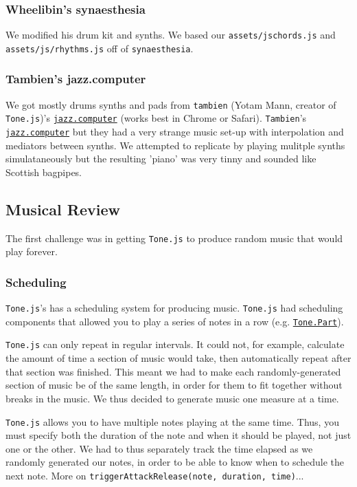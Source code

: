 \documentclass[12pt,a4paper]{article}
\newcommand{\code}{\texttt}
\newcommand{\lightcode}[1]{\colorbox{light-gray}{\texttt{#1}}}
\begin{document}
\subsubsection{Wheelibin's synaesthesia}
We modified his drum kit and synths. We based our \code{assets/jschords.js} and \code{assets/js/rhythms.js} off of \lightcode{synaesthesia}.

\subsubsection{Tambien's jazz.computer}
We got mostly drums synths and pads from \code{tambien} (Yotam Mann, creator of \lightcode{Tone.js})'s \href{http://jazz.computer/}{\lightcode{jazz.computer}} (works best in Chrome or Safari). \code{Tambien}'s \href{http://jazz.computer/}{\lightcode{jazz.computer}} but they had a very strange music set-up with interpolation and mediators between synths. We attempted to replicate by playing mulitple synths simulataneously but the resulting 'piano' was very tinny and sounded like Scottish bagpipes.


\subsection{Musical Review}

The first challenge was in getting \lightcode{Tone.js} to produce random music that would play forever.

\subsubsection{Scheduling}
\lightcode{Tone.js}'s has a scheduling system for producing music. \lightcode{Tone.js} had scheduling components that allowed you to play a series of notes in a row (e.g. \href{https://tonejs.github.io/docs/r12/Part}{\lightcode{Tone.Part}}).

\lightcode{Tone.js} can only repeat in regular intervals. It could not, for example, calculate the amount of time a section of music would take, then automatically repeat after that section was finished. This meant we had to make each randomly-generated section of music be of the same length, in order for them to fit together without breaks in the music. We thus decided to generate music one measure at a time.

\lightcode{Tone.js} allows you to have multiple notes playing at the same time. Thus, you must specify both the duration of the note and when it should be played, not just one or the other. We had to thus separately track the time elapsed as we randomly generated our notes, in order to be able to know when to schedule the next note. More on \code{triggerAttackRelease(note, duration, time)}...
\end{document}
